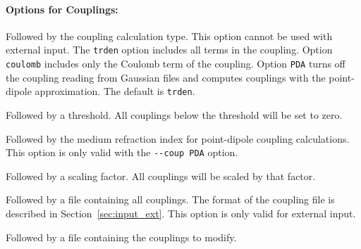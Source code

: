 \documentclass[a4paper,11pt]{article}
\begin{document}
\paragraph*{Options for Couplings:}
\begin{description}[labelsep=10pt, align=left, labelwidth=80pt,labelindent=0pt,leftmargin=90pt]
\item[\texttt{-{}-coup}] Followed by the coupling calculation type. This option cannot be used with external input. The \texttt{trden} option includes all terms in the coupling. Option \texttt{coulomb} includes only the Coulomb term of the coupling. Option \texttt{PDA} turns off the coupling reading from Gaussian files and computes couplings with the point-dipole approximation. The default is \texttt{trden}.
\item[\texttt{-{}-cleancoup}] Followed by a threshold. All couplings below the threshold will be set to zero.
\item[\texttt{-{}-refrind}] Followed by the medium refraction index for point-dipole coupling calculations. This option is only valid with the \texttt{-{}-coup PDA} option.
\item[\texttt{-{}-scalecoup}] Followed by a scaling factor. All couplings will be scaled by that factor. 
\item[\texttt{-{}-incoup}] Followed by a file containing all couplings. The format of the coupling file is described in Section~\ref{sec:input_ext}. This option is only valid for external input.
\item[\texttt{-{}-modcoup}] Followed by a file containing the couplings to modify. 

\end{description}
\end{document}
